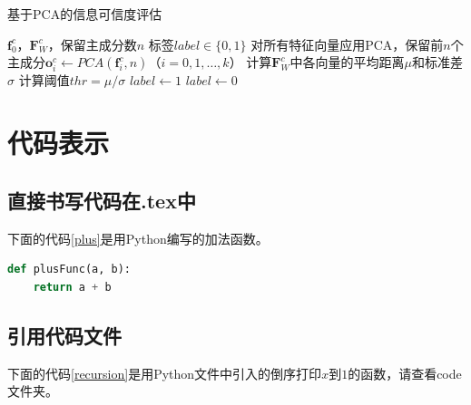 \documentclass[a4paper,AutoFakeBold,oneside,12pt]{book}
\begin{document}
\begin{algorithm}
	\begin{spacing}{1.3}
		\caption{基于PCA的信息可信度评估} 
		\label{PCA_model}
		\renewcommand{\algorithmicrequire}{\textbf{输入：}}
		\renewcommand{\algorithmicensure}{\textbf{输出：}} 
			\begin{algorithmic}[1] 
				\Require $\bm{f}^{c}_{0}$，$\bm{F}^{c}_{W}$，保留主成分数$n$
				\Ensure 标签$label\in \{0,1\}$
				\State 对所有特征向量应用PCA，保留前$n$个主成分$\bm{o}^{c}_{i} \gets PCA(\bm{f}^{c}_{i}, n)$（$i = 0,1,\ldots,k$）
				\State 计算$\bm{F}^{c}_{W}$中各向量的平均距离$\mu$和标准差$\sigma$
				\State 计算阈值$thr = {\mu} / {\sigma}$
					\State $ label \gets 1 $
				\Else
					\State $ label \gets 0 $
				\EndIf
			\end{algorithmic}
	\end{spacing}
\end{algorithm}

\section{代码表示}


\subsection{直接书写代码在.tex中}
下面的代码\ref{plus}是用Python编写的加法函数。

\begin{lstlisting}[language=Python, caption=加法, label=plus, tabsize=2]  
def plusFunc(a, b):
	return a + b 
\end{lstlisting}  

\subsection{引用代码文件}
下面的代码\ref{recursion}是用Python文件中引入的倒序打印$x$到$1$的函数，请查看code文件夹。


\end{document}
